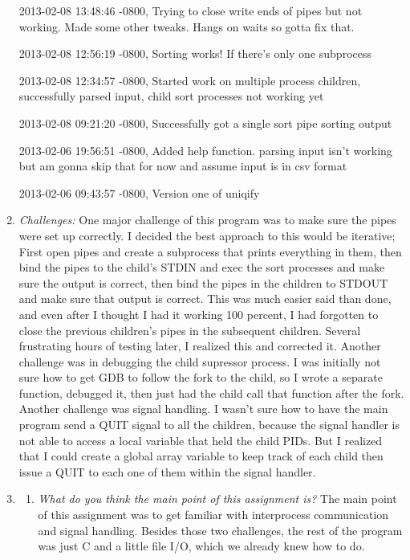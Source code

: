 \documentclass[letterpaper,10pt,titlepage]{article}
\begin{document}
\begin{enumerate}
2013-02-08 13:48:46 -0800, Trying to close write ends of pipes but not working. Made some other tweaks. Hangs on waits so gotta fix that.

2013-02-08 12:56:19 -0800, Sorting works! If there's only one subprocess

2013-02-08 12:34:57 -0800, Started work on multiple process children, successfully parsed input, child sort processes not working yet

2013-02-08 09:21:20 -0800, Successfully got a single sort pipe sorting output

2013-02-06 19:56:51 -0800, Added help function. parsing input isn't working but am gonna skip that for now and assume input is in csv format

2013-02-06 09:43:57 -0800, Version one of uniqify


\item \emph{Challenges:}
One major challenge of this program was to make sure the pipes were set up correctly. I decided the best approach to this would be iterative; First open pipes and create a subprocess that prints everything in them, then bind the pipes to the child's STDIN and exec the sort processes and make sure the output is correct, then bind the pipes in the children to STDOUT and make sure that output is correct. This was much easier said than done, and even after I thought I had it working 100 percent, I had forgotten to close the previous children's pipes in the subsequent children. Several frustrating hours of testing later, I realized this and corrected it. Another challenge was in debugging the child supressor process. I was initially not sure how to get GDB to follow the fork to the child, so I wrote a separate function, debugged it, then just had the child call that function after the fork. Another challenge was signal handling. I wasn't sure how to have the main program send a QUIT signal to all the children, because the signal handler is not able to access a local variable that held the child PIDs. But I realized that I could create a global array variable to keep track of each child then issue a QUIT to each one of them within the signal handler.

\item \begin{enumerate}
	\item \emph{What do you think the main point of this assignment is?} The main point of this assignment was to get familiar with interprocess communication and signal handling. Besides those two challenges, the rest of the program was just C and a little file I/O, which we already knew how to do.


\end{enumerate}
\end{enumerate}
\end{document}
